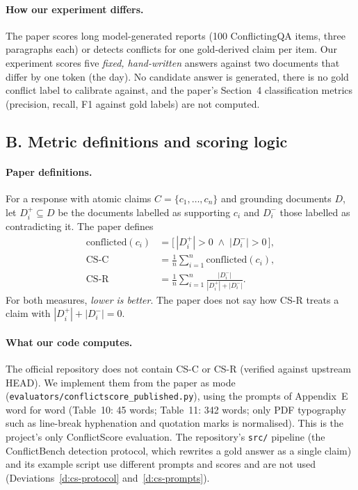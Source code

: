 \documentclass[11pt,a4paper]{article}
\newcommand{\code}[1]{\texttt{\detokenize{#1}}}
\DeclareRobustCommand{\src}[1]{{\small\nolinkurl{#1}}}
\begin{document}
\paragraph{How our experiment differs.}
The paper scores long model-generated reports (100 ConflictingQA items, three paragraphs each) or detects conflicts for one gold-derived claim per item. Our experiment scores five \emph{fixed, hand-written} answers against two documents that differ by one token (the day). No candidate answer is generated, there is no gold conflict label to calibrate against, and the paper's Section~4 classification metrics (precision, recall, F1 against gold labels) are not computed.

\subsection{B. Metric definitions and scoring logic}

\paragraph{Paper definitions.}
For a response with atomic claims $C=\{c_1,\dots,c_n\}$ and grounding documents $D$, let $D^+_i\subseteq D$ be the documents labelled as supporting $c_i$ and $D^-_i$ those labelled as contradicting it. The paper defines
\begin{align}
\text{conflicted}(c_i) &= \bigl[\,|D^+_i|>0 \;\wedge\; |D^-_i|>0\,\bigr],\\
\text{CS-C} &= \frac{1}{n}\sum_{i=1}^{n} \text{conflicted}(c_i), \\
\text{CS-R} &= \frac{1}{n}\sum_{i=1}^{n} \frac{|D^-_i|}{|D^+_i|+|D^-_i|}.
\end{align}
For both measures, \emph{lower is better}. The paper does not say how CS-R treats a claim with $|D^+_i|+|D^-_i|=0$.

\paragraph{What our code computes.}
The official repository does not contain CS-C or CS-R (verified against upstream HEAD). We implement them from the paper as mode \code{published_cs} (\src{evaluators/conflictscore_published.py}), using the prompts of Appendix~E word for word (Table~10: 45 words; Table~11: 342 words; only PDF typography such as line-break hyphenation and quotation marks is normalised). This is the project's only ConflictScore evaluation. The repository's \src{src/} pipeline (the ConflictBench detection protocol, which rewrites a gold answer as a single claim) and its example script use different prompts and scores and are not used (Deviations~\ref{d:cs-protocol} and~\ref{d:cs-prompts}).
\end{document}

